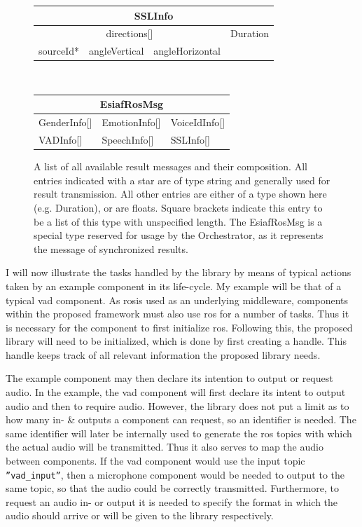 \begin{figure}[]
	\begin{tabular}{| l | l | l | l|}
		\hline
		
		\multicolumn{4}{|c|}{\textbf{SSLInfo}} \\ \hline
		\multicolumn{3}{|c|}{directions[]} & Duration  \\\cline{1-3}
		sourceId* & angleVertical & angleHorizontal & \\\hline
	\end{tabular}\\\vspace{0.3cm}
	
	\begin{tabular}{| l | l | l |}
		\hline
		
		\multicolumn{3}{|c|}{\textbf{EsiafRosMsg}} \\ \hline
		GenderInfo[]	& EmotionInfo[]	& VoiceIdInfo[]	\\\hline
		VADInfo[]	& SpeechInfo[]	& SSLInfo[] \\\hline
	\end{tabular}
	\caption{A list of all available result messages and their composition.
		All entries indicated with a star are of type string and generally used for result transmission.
		All other entries are either of a type shown here (e.g. Duration), or are floats.
		Square brackets indicate this entry to be a list of this type with unspecified length.
		The EsiafRosMsg is a special type reserved for usage by the Orchestrator, as it represents the message of synchronized results.
		}
	\label{table:main:lib:messages}
\end{figure}


I will now illustrate the tasks handled by the library by means of typical actions taken by an example component in its life-cycle.
My example will be that of a typical \gls{vad} component.
As \gls{ros}is used as an underlying middleware, components within the proposed framework must also use \gls{ros} for a number of tasks.
Thus it is necessary for the component to first initialize \gls{ros}.
Following this, the proposed library will need to be initialized, which is done by first creating a handle.
This handle keeps track of all relevant information the proposed library needs.

The example component may then declare its intention to output or request audio.
In the example, the \gls{vad} component will first declare its intent to output audio and then to require audio.
However, the library does not put a limit as to how many in- \& outputs a component can request, so an identifier is needed.
The same identifier will later be internally used to generate the \gls{ros} topics with which the actual audio will be transmitted.
Thus it also serves to map the audio between components.
If the \gls{vad} component would use the input topic \texttt{''vad\_input''}, then a microphone component would be needed to output to the same topic, so that the audio could be correctly transmitted.
Furthermore, to request an audio in- or output it is needed to specify the format in which the audio should arrive or will be given to the library respectively.

